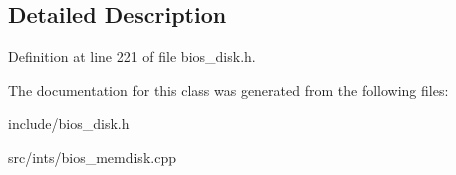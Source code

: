 \subsection{Detailed Description}


Definition at line 221 of file bios\-\_\-disk.\-h.



The documentation for this class was generated from the following files\-:\begin{DoxyCompactItemize}
\item 
include/bios\-\_\-disk.\-h\item 
src/ints/bios\-\_\-memdisk.\-cpp\end{DoxyCompactItemize}
